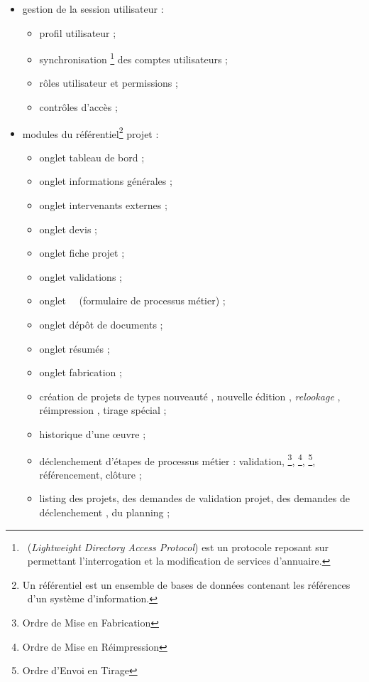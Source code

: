 \begin{itemize}
	\item gestion de la session utilisateur :
    	\begin{itemize}
			\item profil utilisateur ;
			\item synchronisation \aldap\footnote{\aldap\ (\textit{Lightweight Directory Access Protocol}) est un protocole reposant sur \atcpip\ permettant l'interrogation et la modification de services d'annuaire.\cite{ldap}} des comptes utilisateurs ;
			\item rôles utilisateur et permissions ;
			\item contrôles d'accès ;
		\end{itemize}
    \item modules du référentiel\footnote{Un référentiel est un ensemble de bases de données contenant les \og références \fg\ d'un système d'information.\cite{referentiel}} projet :
    	\begin{itemize}
			\item onglet \og tableau de bord \fg ;
			\item onglet \og informations générales \fg ;
			\item onglet \og intervenants externes \fg ;
			\item onglet \og devis \fg ;
			\item onglet \og fiche projet \fg ;
			\item onglet \og validations \fg ;
			\item onglet \og \abat\ \aef\ \fg\aast (formulaire de processus métier) ;
			\item onglet \og dépôt de documents \fg ;
			\item onglet \og résumés \fg ;
			\item onglet \og fabrication \fg ;
			\item création de projets de types \og nouveauté \fg, \og nouvelle édition \fg, \og \textit{relookage} \fg, \og réimpression \fg, \og tirage spécial \fg\aast ;
			\item historique d'une œuvre ;
			\item déclenchement d'étapes de processus métier : validation, \aomf\footnote{Ordre de Mise en Fabrication}, \aomr\footnote{Ordre de Mise en Réimpression}, \aoet\footnote{Ordre d'Envoi en Tirage}, référencement\aast, clôture ;
			\item listing des projets\aast, des demandes de validation projet\aast, des demandes de déclenchement \aoet\aast, du planning \aef\aast ;

\end{itemize}
\end{itemize}

